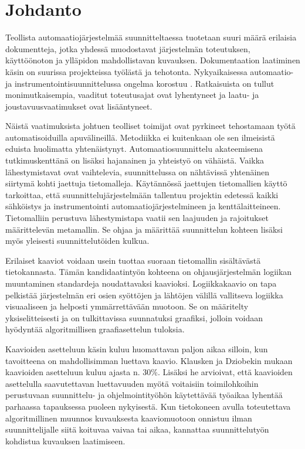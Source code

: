 \documentclass[finnish,12pt]{article}
\begin{document}
	\cleardoublepage
	\storeinipagenumber
	\setcounter{page}{1}


	\section{Johdanto}
	\thispagestyle{empty}

Teollista automaatiojärjestelmää suunnitteltaessa tuotetaan suuri määrä erilaisia dokumentteja, jotka
yhdessä muodostavat järjestelmän toteutuksen, käyttöönoton ja ylläpidon mahdollistavan kuvauksen.
Dokumentaation laatiminen käsin on suurissa projekteissa työlästä ja tehotonta.
Nykyaikaisessa automaatio- ja instrumentointisuunnittelussa ongelma korostuu \cite{RefWorks:41}.
Ratkaisuista on tullut monimutkaisempia, vaaditut toteutusajat ovat lyhentyneet ja laatu- ja joustavuusvaatimukset ovat lisääntyneet.

Näistä vaatimuksista johtuen teolliset toimijat ovat pyrkineet tehostamaan työtä automatisoiduilla apuvälineillä.
Metodiikka ei kuitenkaan ole sen ilmeisistä eduista huolimatta yhtenäistynyt.
Automaatiosuunnittelu akateemisena tutkimuskenttänä on lisäksi hajanainen ja yhteistyö on vähäistä.
Vaikka lähestymistavat ovat vaihtelevia, suunnittelussa on nähtävissä yhtenäinen siirtymä kohti jaettuja tietomalleja.
Käytännössä jaettujen tietomallien käyttö tarkoittaa, että suunnittelujärjestelmään tallentuu projektin edetessä kaikki sähköistys ja instrumentointi automaatiojärjestelmineen ja kenttälaitteineen.
Tietomalliin perustuva lähestymistapa vaatii sen laajuuden ja rajoitukset määrittelevän metamallin.
Se ohjaa ja määrittää suunnittelun kohteen lisäksi myös yleisesti suunnittelutöiden kulkua.

Erilaiset kaaviot voidaan usein tuottaa suoraan tietomallin sisältävästä tietokannasta.
Tämän kandidaatintyön kohteena on ohjausjärjestelmän logiikan muuntaminen standardeja noudattavaksi kaavioksi.
Logiikkakaavio on tapa pelkistää järjestelmän eri osien syöttöjen ja lähtöjen välillä vallitseva logiikka visuaaliseen ja helposti ymmärrettävään muotoon.
Se on määritelty yksiselitteisesti ja on tulkittavissa suunnatuksi graafiksi, jolloin voidaan hyödyntää algoritmillisen graafiasettelun tuloksia.

Kaavioiden asetteluun käsin kuluu huomattavan paljon aikaa silloin, kun tavoitteena on mahdollisimman luettava kaavio.
Klausken ja Dziobekin mukaan kaavioiden asetteluun kuluu ajasta n. 30\%.
Lisäksi he arvioivat, että kaavioiden asettelulla saavutettavan luettavuuden myötä voitaisiin toimilohkoihin perustuvaan suunnittelu- ja ohjelmointityöhön käytettävää työaikaa lyhentää parhaassa tapauksessa puoleen nykyisestä. \cite{Refworks:63}
Kun tietokoneen avulla toteutettava algoritmillinen muunnos kuvauksesta kaaviomuotoon onnistuu ilman suunnittelijalle siitä koituvaa vaivaa tai aikaa, kannattaa suunnittelutyön kohdistua kuvauksen laatimiseen.
\end{document}
